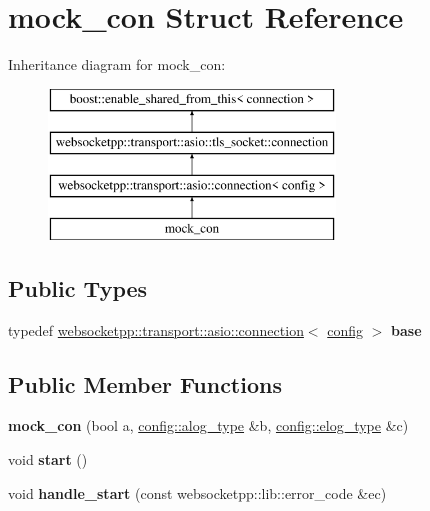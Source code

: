 \hypertarget{structmock__con}{}\section{mock\+\_\+con Struct Reference}
\label{structmock__con}
Inheritance diagram for mock\+\_\+con\+:\begin{figure}[H]
\begin{center}
\leavevmode
\includegraphics[height=4.000000cm]{structmock__con}
\end{center}
\end{figure}
\subsection*{Public Types}
\begin{DoxyCompactItemize}
\item 
typedef \hyperlink{classwebsocketpp_1_1transport_1_1asio_1_1connection}{websocketpp\+::transport\+::asio\+::connection}$<$ \hyperlink{classconfig}{config} $>$ {\bfseries base}\hypertarget{structmock__con_a7a1e76fdc7a1c373d9eda04c5e24e40a}{}\label{structmock__con_a7a1e76fdc7a1c373d9eda04c5e24e40a}

\end{DoxyCompactItemize}
\subsection*{Public Member Functions}
\begin{DoxyCompactItemize}
\item 
{\bfseries mock\+\_\+con} (bool a, \hyperlink{classwebsocketpp_1_1log_1_1stub}{config\+::alog\+\_\+type} \&b, \hyperlink{classwebsocketpp_1_1log_1_1stub}{config\+::elog\+\_\+type} \&c)\hypertarget{structmock__con_a7492a7e931f3415ef6aec45655dc38a1}{}\label{structmock__con_a7492a7e931f3415ef6aec45655dc38a1}

\item 
void {\bfseries start} ()\hypertarget{structmock__con_a76adb10b2073f73cf11f310f113adf55}{}\label{structmock__con_a76adb10b2073f73cf11f310f113adf55}

\item 
void {\bfseries handle\+\_\+start} (const websocketpp\+::lib\+::error\+\_\+code \&ec)\hypertarget{structmock__con_a786e965628529c84c83de9db6700dd5f}{}\label{structmock__con_a786e965628529c84c83de9db6700dd5f}

\end{DoxyCompactItemize}
